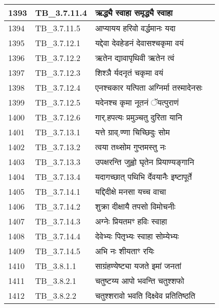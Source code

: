 \documentclass[17pt]{extarticle}
\begin{document}
\begin{longtable}{||p{0.4in}||p{0.9in}||p{4.0in}||p{0.9in}||}
        \hline
            1393 & TB\_3.7.11.4 & ऋद्ध्यै स्वाहा समृद्ध्यै स्वाहा &      \\
        \hline
            1394 & TB\_3.7.11.5 & आप्यायय हरिवो वर्द्धमानः यदा &      \\
        \hline
            1395 & TB\_3.7.12.1 & यद्देवा देवहेडनं देवासश्चकृमा वयं &      \\
        \hline
            1396 & TB\_3.7.12.2 & ऋतेन द्यावापृथिवी ऋतेन त्वं &      \\
        \hline
            1397 & TB\_3.7.12.3 & शिश्ञै र्यदनृतं चकृमा वयं &      \\
        \hline
            1398 & TB\_3.7.12.4 & एनश्चकार यत्पिता अग्निर्मा तस्मादेनसः &      \\
        \hline
            1399 & TB\_3.7.12.5 & यदेनश्च कृमा नूतनं ॅयत्पुराणं &      \\
        \hline
            1400 & TB\_3.7.12.6 & गार्.हपत्यः प्रमुञ्चतु दुरिता यानि &      \\
        \hline
            1401 & TB\_3.7.13.1 & यत्ते ग्राव्.ण्णा चिच्छिदुः सोम &      \\
        \hline
            1402 & TB\_3.7.13.2 & त्वया तथ्सोम गुप्तमस्तु नः &      \\
        \hline
            1403 & TB\_3.7.13.3 & उपक्षरन्ति जुह्वो घृतेन प्रियाण्यङ्गानि &      \\
        \hline
            1404 & TB\_3.7.13.4 & यदागच्छात् पथिभि र्देवयानैः इष्टापूर्ते &      \\
        \hline
            1405 & TB\_3.7.14.1 & यद्दिदीक्षे मनसा यच्च वाचा &      \\
        \hline
            1406 & TB\_3.7.14.2 & शुक्रा दीक्षायै तपसो विमोचनीः &      \\
        \hline
            1407 & TB\_3.7.14.3 & अग्नेः प्रियतमꣳ हविः स्वाहा &      \\
        \hline
            1408 & TB\_3.7.14.4 & देवेभ्यः पितृभ्यः स्वाहा सोम्येभ्यः &      \\
        \hline
            1409 & TB\_3.7.14.5 & अभि नः शीयताꣳ रयिः &      \\
        \hline
            1410 & TB\_3.8.1.1 & साग्रंहण्येष्ट्या यजते इमां जनतां &      \\
        \hline
            1411 & TB\_3.8.2.1 & चतुष्टय्य आपो भवन्ति चतुश्शफो &      \\
        \hline
            1412 & TB\_3.8.2.2 & चतुश्शरावो भवति दिक्ष्वेव प्रतितिष्ठति &      \\

\end{longtable}
\end{document}
